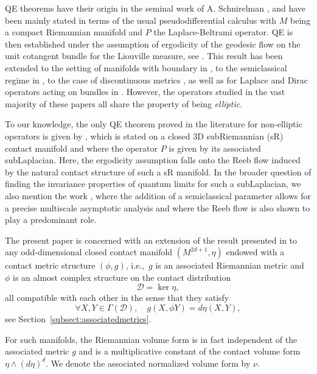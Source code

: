 \documentclass[12pt,a4paper]{amsart}
\theoremstyle{plain}
\theoremstyle{definition}
\theoremstyle{remark}
\numberwithin{equation}{section}
\theoremstyle{definition}
\def \cD{\mathcal{D}}
\numberwithin{equation}{section}
\begin{document}
QE theorems have their origin in the seminal work of A. Schnirelman \cite{Sch}, and have been mainly stated in terms of the usual pseudodifferential calculus with $M$ being a compact Riemannian manifold and $P$ the Laplace-Beltrami operator. QE is then established under the assumption of ergodicity of the geodesic flow on the unit cotangent bundle for the Liouville measure, see \cite{CdV, Zel}. This result has been extended to the setting of manifolds with boundary in \cite{GL, ZZ}, to the semiclassical regime in \cite{HMR}, to the case of discontinuous metrics \cite{JSS}, as well as for Laplace and Dirac operators acting on bundles in \cite{JS}. However, the operators studied in the vast majority of these papers all share the property of being \emph{elliptic}. 

To our knowledge, the only QE theorem proved in the literature for non-elliptic operators is given by \cite[Theorem A]{CdVHT18}, which is stated on a closed 3D subRiemannian (sR) contact manifold and where the operator $P$ is given by its associated subLaplacian. Here, the ergodicity assumption falls onto the Reeb flow induced by the natural contact structure of such a sR manifold. In the broader question of finding the invariance properties of quantum limits for such a subLaplacian, we also mention the work \cite{AR}, where the addition of a semiclassical parameter allows for a precise multiscale asymptotic analysis and where the Reeb flow is also shown to play a predominant role.

\vspace{0.25cm}

The present paper is concerned with an extension of the result presented in \cite{CdVHT18} to any odd-dimensional closed contact manifold $(M^{2d+1},\eta)$ endowed with a contact metric structure $(\phi,g)$, i.e.,~$g$ is an associated Riemannian metric and $\phi$ is an almost complex structure on the contact distribution $$\cD = \ker \eta,$$ all compatible with each other in the sense that they satisfy
\begin{equation*}
    \forall X,Y\in\Gamma(\cD), \quad g(X,\phi Y) = d\eta(X,Y),
\end{equation*}
see Section~\ref{subsect:associatedmetrics}.

For such manifolds, the Riemannian volume form is in fact independent of the associated metric $g$ and is a multiplicative constant of the contact volume form $\eta\wedge (d\eta)^d$. We denote the associated normalized volume form by $\nu$.
\end{document}
